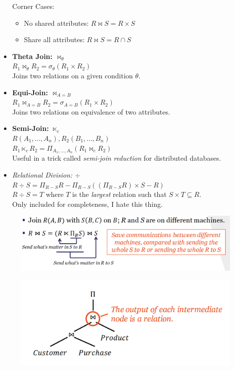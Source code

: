 \begin{itemize}
Corner Cases: \begin{itemize}
\item No shared attributes: $R \Join S = R \times S$
\item Share all attributes: $R \Join S = R \cap S$
\end{itemize}
\item \textbf{Theta Join: $\Join_\theta$}\\
$R_1 \Join_\theta R_2 = \sigma_\theta(R_1 \times R_2)$\\
Joins two relations on a given condition $\theta$.
\item \textbf{Equi-Join: $\Join_{A=B}$}\\
$R_1 \Join_{A=B} R_2 = \sigma_{A=B}(R_1 \times R_2)$\\
Joins two relations on equivalence of two attributes.
\item \textbf{Semi-Join: $\ltimes_c$}\\
$R(A_1, ..., A_n), R_2(B_1, ..., B_n)$\\
$R_1 \ltimes_c R_2 = \Pi_{A_1, ..., A_n}(R_1 \Join_c R_2)$\\
Useful in a trick called \textit{semi-join reduction} for distributed databases.
\item \textit{Relational Division: $\div$}\\
$R \div S = \Pi_{R-S}R - \Pi_{R-S}((\Pi_{R-S}R) \times S - R)$\\
$R \div S = T$ where $T$ is the \textit{largest} relation such that $S \times T \subseteq R$.\\
Only included for completeness, I hate this thing.
\end{itemize}
\begin{figure}[H]
\begin{minipage}[t]{.5\textwidth}
\centering
\includegraphics[width=\textwidth]{images/semi-join_reduction.PNG}
\label{semi_join_reduction}
\end{minipage}
\begin{minipage}[t]{.5\textwidth}
\centering
\includegraphics[width=\textwidth]{images/relational_algebra_expression.PNG}
\label{relational_algebra_expression}
\end{minipage}
\end{figure}

